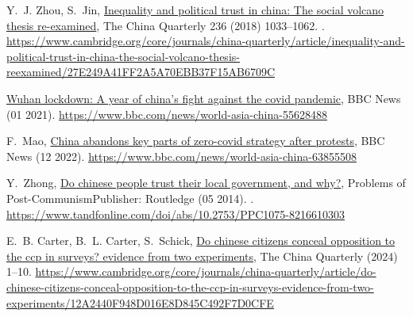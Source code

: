 \documentclass[
  number]{elsarticle}
\begin{document}
\begin{thebibliography}{10}
Y.~J. Zhou, S.~Jin, \href{https://www.cambridge.org/core/journals/china-quarterly/article/inequality-and-political-trust-in-china-the-social-volcano-thesis-reexamined/27E249A41FF2A5A70EBB37F15AB6709C}{Inequality and political trust in china: The social volcano thesis re-examined}, The China Quarterly 236 (2018) 1033--1062.
\newblock \href {https://doi.org/10.1017/S0305741018001297} {}.
\newline\urlprefix\url{https://www.cambridge.org/core/journals/china-quarterly/article/inequality-and-political-trust-in-china-the-social-volcano-thesis-reexamined/27E249A41FF2A5A70EBB37F15AB6709C}

\href{https://www.bbc.com/news/world-asia-china-55628488}{Wuhan lockdown: A year of china's fight against the covid pandemic}, BBC News (01 2021).
\newline\urlprefix\url{https://www.bbc.com/news/world-asia-china-55628488}

F.~Mao, \href{https://www.bbc.com/news/world-asia-china-63855508}{China abandons key parts of zero-covid strategy after protests}, BBC News (12 2022).
\newline\urlprefix\url{https://www.bbc.com/news/world-asia-china-63855508}

Y.~Zhong, \href{https://www.tandfonline.com/doi/abs/10.2753/PPC1075-8216610303}{Do chinese people trust their local government, and why?}, Problems of Post-CommunismPublisher: Routledge (05 2014).
\newblock \href {https://doi.org/10.2753/PPC1075-8216610303} {}.
\newline\urlprefix\url{https://www.tandfonline.com/doi/abs/10.2753/PPC1075-8216610303}

E.~B. Carter, B.~L. Carter, S.~Schick, \href{https://www.cambridge.org/core/journals/china-quarterly/article/do-chinese-citizens-conceal-opposition-to-the-ccp-in-surveys-evidence-from-two-experiments/12A2440F948D016E8D845C492F7D0CFE}{Do chinese citizens conceal opposition to the ccp in surveys? evidence from two experiments}, The China Quarterly (2024) 1--10\href {https://doi.org/10.1017/S0305741023001819} {}.
\newline\urlprefix\url{https://www.cambridge.org/core/journals/china-quarterly/article/do-chinese-citizens-conceal-opposition-to-the-ccp-in-surveys-evidence-from-two-experiments/12A2440F948D016E8D845C492F7D0CFE}


\end{thebibliography}
\end{document}
